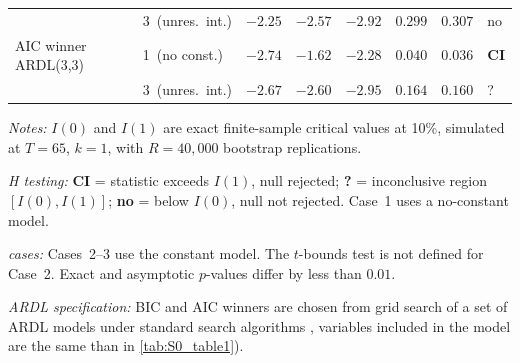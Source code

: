 \begin{table}[htbp]
\begin{threeparttable}
\begin{tabular}{l l r r r r r l}
			& 3~(unres.\ int.) & $-2.25$ & $-2.57$ & $-2.92$ & $0.299$ & $0.307$ & no \\[4pt]
			AIC winner ARDL(3,3)
			& 1~(no const.)    & $-2.74$ & $-1.62$ & $-2.28$ & $0.040$ & $0.036$ & \textbf{CI} \\
			& 3~(unres.\ int.) & $-2.67$ & $-2.60$ & $-2.95$ & $0.164$ & $0.160$ & ? \\
			\bottomrule
		\end{tabular}
		\begin{tablenotes}
			\footnotesize
			\item \textit{Notes:}
			$I(0)$ and $I(1)$ are exact finite-sample critical values at 10\%,
			simulated at $T=65$, $k=1$, with $R=40,000$ bootstrap replications.
			\item \textit{H testing:} \textbf{CI} = statistic exceeds $I(1)$, null rejected;
			\textbf{?} = inconclusive region $[I(0), I(1)]$;
			\textbf{no} = below $I(0)$, null not rejected.
			Case~1 uses a no-constant model. 
			\item \textit{\citet{Pesaran2001} cases:} Cases~2--3 use the constant model. The $t$-bounds test is not defined for Case~2. Exact and asymptotic $p$-values differ by less than $0.01$.
			\item \textit{ARDL specification:} BIC and AIC winners are chosen from grid search of a set of ARDL models under standard search algorithms \citep{Natsiopoulos2024}, variables included in the model are the same than in \ref{tab:S0_table1}).
		\end{tablenotes}
	\end{threeparttable}
\end{table}
